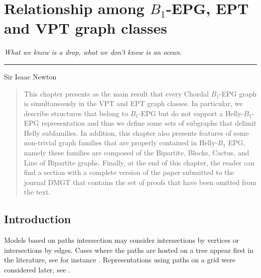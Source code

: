 \chapter{Relationship among  $B_1$-EPG, EPT and VPT graph classes}
\label{cap:v}

\begin{flushright}
\begin{minipage}[t][0cm][b]{0.47\textwidth}
\emph{
What we know is a drop, what we don't know is an ocean.}
\end{minipage}

\rule[0cm]{7cm}{0.03cm}%

Sir Isaac Newton
\end{flushright}

\begin{quotation}
This chapter presents as the main result that every Chordal $B_1$-EPG graph is simultaneously in the VPT and EPT graph classes. In particular, we describe structures that belong to $B_1$-EPG but  do not support a Helly-$B_1$-EPG representation and thus we define some sets of subgraphs that delimit Helly subfamilies. 
 In addition, this chapter also presents features of some non-trivial graph families that are properly contained in Helly-$B_1$ EPG, namely these families are composed of the Bipartite, Blocks, Cactus, and Line of Bipartite  graphs. Finally, at the end of this chapter, the reader can find a section with a complete version of the paper submitted to the journal DMGT that contains the set of proofs that have been omitted from the text.
\end{quotation}


\section{Introduction}

Models based on paths intersection  may consider  intersections by vertices or   intersections by edges.  Cases where the paths are hosted on a tree  appear first in the literature, see for instance \cite{gavril1978recognition, golumbic1985edge, golumbic1985}.  Representations using paths on a grid were considered later, see  \cite{golumbic2009,golumbic2013, golumbic2013intersection}. %

